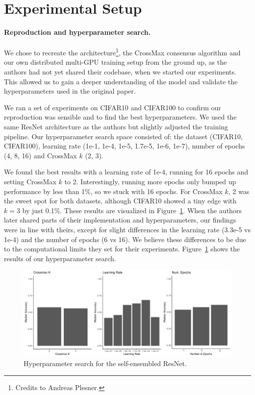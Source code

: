 \documentclass[a4paper, oneside]{discothesis}
\begin{document}
\section{Experimental Setup}

\paragraph{Reproduction and hyperparameter search.}

We chose to recreate the architecture\footnote{Credits to Andreas Plesner.}, the CrossMax consensus algorithm and our own distributed multi-GPU training setup from the ground up, as the authors had not yet shared their codebase, when we started our experiments. This allowed us to gain a deeper understanding of the model and validate the hyperparameters used in the original paper.

We ran a set of experiments on CIFAR10 and CIFAR100 to confirm our reproduction was sensible and to find the best hyperparameters. We used the same ResNet architecture as the authors but slightly adjusted the training pipeline. Our hyperparameter search space consisted of: the dataset (CIFAR10, CIFAR100), learning rate (1e-1, 1e-4, 1e-5, 1.7e-5, 1e-6, 1e-7), number of epochs (4, 8, 16) and CrossMax $k$ (2, 3).

We found the best results with a learning rate of 1e-4, running for 16 epochs and setting CrossMax $k$ to 2. Interestingly, running more epochs only bumped up performance by less than 1\%, so we stuck with 16 epochs. For CrossMax $k$, 2 was the sweet spot for both datasets, although CIFAR10 showed a tiny edge with $k=3$ by just 0.1\%. These results are visualized in Figure~\ref{fig:se-hyperparams}. When the authors later shared parts of their implementation and hyperparameters, our findings were in line with theirs, except for slight differences in the learning rate (3.3e-5 vs 1e-4) and the number of epochs (6 vs 16). We believe these differences to be due to the computational limits they set for their experiments. Figure~\ref{fig:se-hyperparams} shows the results of our hyperparameter search.

\begin{figure}
	\centering
	\includegraphics[width=1\columnwidth]{figures/hyperparams.pdf}
	\caption{Hyperparameter search for the self-ensembled ResNet.}
	\label{fig:se-hyperparams}
\end{figure}
\end{document}
